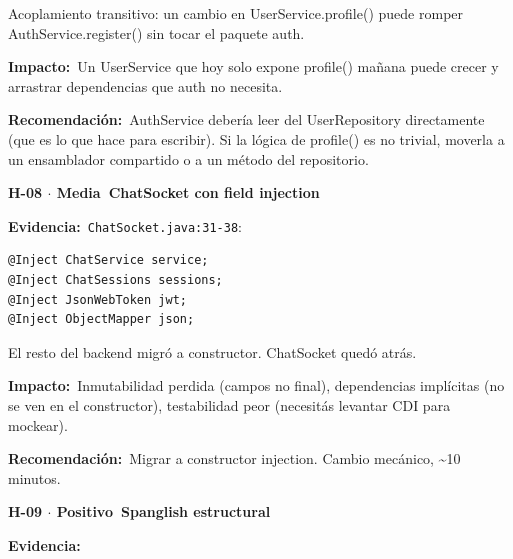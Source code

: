 \documentclass[10pt,a4paper]{article}
\newcommand{\code}[1]{\nolinkurl{#1}}
\newcommand{\badgeMedia}{\colorbox{yellow!35}{\textcolor{brown!90!black}{\textbf{\footnotesize Media}}}}
\newcommand{\badgePositivo}{\colorbox{green!20}{\textcolor{green!60!black}{\textbf{\footnotesize Positivo}}}}
\begin{document}
Acoplamiento transitivo: un cambio en UserService.profile() puede romper AuthService.register() sin tocar el paquete auth.\par\vspace{0.4em}
\noindent\textbf{Impacto:}\ Un UserService que hoy solo expone profile() mañana puede crecer y arrastrar dependencias que auth no necesita.\par\vspace{0.4em}
\noindent\textbf{Recomendación:}\ AuthService debería leer del UserRepository directamente (que es lo que hace para escribir). Si la lógica de profile() es no trivial, moverla a un ensamblador compartido o a un método del repositorio.\par\vspace{0.4em}
\vspace{0.8em}\noindent\textbf{\large H-08 $\cdot$ \badgeMedia\  ChatSocket con field injection}\par\vspace{0.3em}
\noindent\textbf{Evidencia:}\ \code{ChatSocket.java:31-38}:\par\vspace{0.4em}
\begin{tcolorbox}[colback=codebg,colframe=gray!40,arc=1mm]\small
\begin{verbatim}
@Inject ChatService service;
@Inject ChatSessions sessions;
@Inject JsonWebToken jwt;
@Inject ObjectMapper json;
\end{verbatim}
\end{tcolorbox}\vspace{0.4em}
El resto del backend migró a constructor. ChatSocket quedó atrás.\par\vspace{0.4em}
\noindent\textbf{Impacto:}\ Inmutabilidad perdida (campos no final), dependencias implícitas (no se ven en el constructor), testabilidad peor (necesitás levantar CDI para mockear).\par\vspace{0.4em}
\noindent\textbf{Recomendación:}\ Migrar a constructor injection. Cambio mecánico, \textasciitilde{}10 minutos.\par\vspace{0.4em}
\vspace{0.8em}\noindent\textbf{\large H-09 $\cdot$ \badgePositivo\  Spanglish estructural}\par\vspace{0.3em}
\noindent\textbf{Evidencia:}\ \par\vspace{0.4em}
\end{document}

